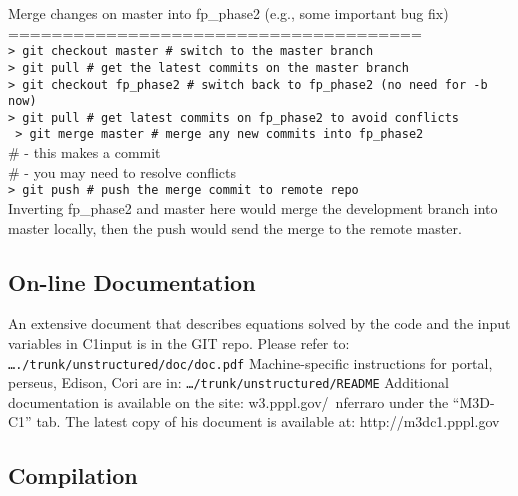Merge changes on master into fp\_phase2 (e.g., some important bug fix)
\\
======================================
\\
\texttt{> git checkout master    \# switch to the master branch
}
\\
\texttt{> git pull               \# get the latest commits on the master branch
}
\\
\texttt{> git checkout fp\_phase2 \# switch back to fp\_phase2 (no need for -b now)
}
\\
\texttt{> git pull               \# get latest commits on fp\_phase2 to avoid conflicts
}
\\
\texttt{
> git merge master       \# merge any new commits into fp\_phase2
}
\\
                         \#  - this makes a commit
\\
                         \#  - you may need to resolve conflicts
\\
\texttt{> git push               \# push the merge commit to remote repo
}
\\

Inverting fp\_phase2 and master here would merge the development branch into master locally, then the push would send the merge to the remote master.

\subsection{On-line Documentation}
An extensive document that describes equations solved by the code and the input variables in C1input is in the GIT repo. Please refer to:
\\
\texttt{…./trunk/unstructured/doc/doc.pdf}
\newline\newline
Machine-specific instructions for portal, perseus, Edison, Cori are in:  
\texttt{…/trunk/unstructured/README}
\newline\newline
Additional documentation is available on the site:  w3.pppl.gov/~nferraro under the “M3D-C1” tab.
\newline\newline
The latest copy of his document is available at: http://m3dc1.pppl.gov

\subsection{Compilation}
